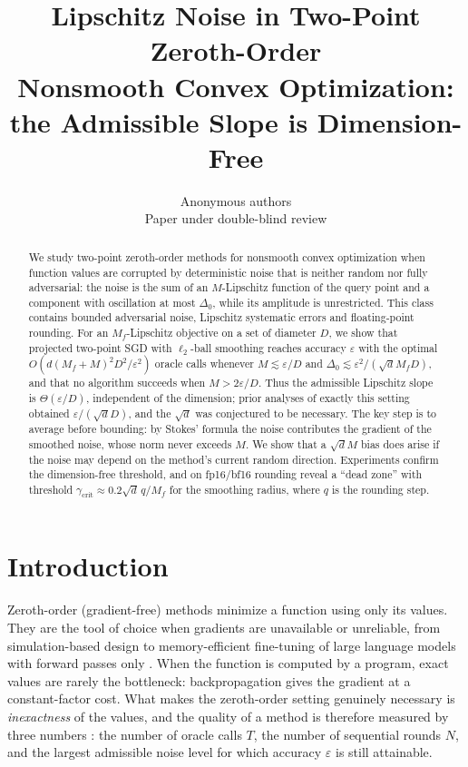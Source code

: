\documentclass{article} %
\title{Lipschitz Noise in Two-Point Zeroth-Order\\ Nonsmooth Convex Optimization:\\ the Admissible Slope is Dimension-Free}
\author{Anonymous authors\\Paper under double-blind review}
\renewcommand{\eps}{\varepsilon}
\theoremstyle{plain}
\theoremstyle{definition}
\theoremstyle{remark}
\begin{document}
\maketitle

\begin{abstract}
We study two-point zeroth-order methods for nonsmooth convex optimization when function values are corrupted by deterministic noise that is neither random nor fully adversarial: the noise is the sum of an $M$-Lipschitz function of the query point and a component with oscillation at most $\Delta_0$, while its amplitude is unrestricted. This class contains bounded adversarial noise, Lipschitz systematic errors and floating-point rounding. For an $M_f$-Lipschitz objective on a set of diameter $D$, we show that projected two-point SGD with $\ell_2$-ball smoothing reaches accuracy $\eps$ with the optimal $O(d(M_f+M)^2D^2/\eps^2)$ oracle calls whenever $M\lesssim\eps/D$ and $\Delta_0\lesssim\eps^2/(\sqrt d M_fD)$, and that no algorithm succeeds when $M>2\eps/D$. Thus the admissible Lipschitz slope is $\Theta(\eps/D)$, independent of the dimension; prior analyses of exactly this setting obtained $\eps/(\sqrt d D)$, and the $\sqrt d$ was conjectured to be necessary. The key step is to average before bounding: by Stokes' formula the noise contributes the gradient of the smoothed noise, whose norm never exceeds $M$. We show that a $\sqrt d M$ bias does arise if the noise may depend on the method's current random direction. Experiments confirm the dimension-free threshold, and on fp16/bf16 rounding reveal a ``dead zone'' with threshold $\gamma_{\mathrm{crit}}\approx 0.2\sqrt d\,q/M_f$ for the smoothing radius, where $q$ is the rounding step.
\end{abstract}

\section{Introduction}\label{sec:intro}

Zeroth-order (gradient-free) methods minimize a function using only its values. They are the tool of choice when gradients are unavailable or unreliable, from simulation-based design to memory-efficient fine-tuning of large language models with forward passes only \citep{malladi2023fine}. When the function is computed by a program, exact values are rarely the bottleneck: backpropagation gives the gradient at a constant-factor cost. What makes the zeroth-order setting genuinely necessary is \emph{inexactness} of the values, and the quality of a method is therefore measured by three numbers \citep{gasnikov2022survey}: the number of oracle calls $T$, the number of sequential rounds $N$, and the largest admissible noise level for which accuracy $\eps$ is still attainable.
\end{document}
